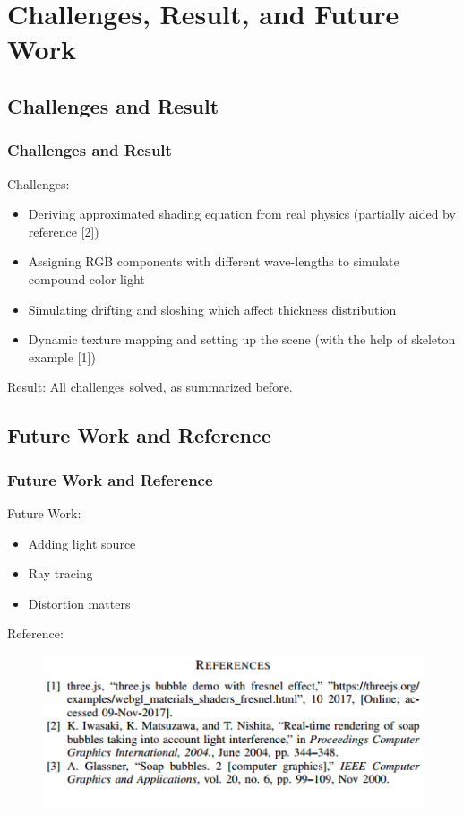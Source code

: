 \documentclass{beamer}
\begin{document}
\section{Challenges, Result, and Future Work}

\subsection{Challenges and Result}

\begin{frame}
	\frametitle{Challenges and Result}
	Challenges:
	\begin{itemize}
	\item Deriving approximated shading equation from real physics (partially aided by reference [2])
	\item Assigning RGB components with different wave-lengths to simulate compound color light
	\item Simulating drifting and sloshing which affect thickness distribution
	\item Dynamic texture mapping and setting up the scene (with the help of skeleton example [1])
	\end{itemize}
	Result:
	All challenges solved, as summarized before.
\end{frame}


\subsection{Future Work and Reference}

\begin{frame}
	\frametitle{Future Work and Reference}
	Future Work:
	\begin{itemize}
		\item Adding light source
		\item Ray tracing
		\item Distortion matters
	\end{itemize}
	Reference:
	\begin{figure}
		\centering
		\includegraphics[width=0.8\linewidth]{reference.png}
	\end{figure}
\end{frame}

\end{document}
